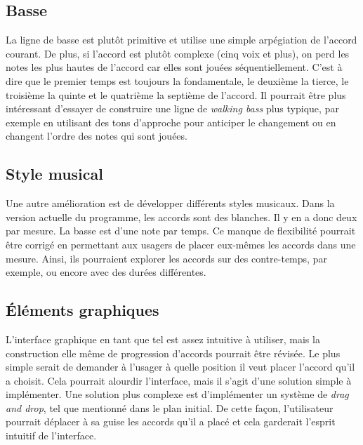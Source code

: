 \documentclass[letterpaper,12pt]{scrartcl}
\begin{document}
		\subsection{Basse}
		La ligne de basse est plutôt primitive et utilise une simple arpégiation de l'accord courant. De plus, si l'accord est plutôt complexe (cinq voix et plus), on perd les notes les plus hautes de l'accord car elles sont jouées séquentiellement. C'est à dire que le premier temps est toujours la fondamentale, le deuxième la tierce, le troisième la quinte et le quatrième la septième de l'accord. Il pourrait être plus intéressant d'essayer de construire une ligne de \textit{walking bass} plus typique, par exemple en utilisant des tons d'approche pour anticiper le changement ou en changent l'ordre des notes qui sont jouées.
		
		\subsection{Style musical}
		Une autre amélioration est de développer différents styles musicaux. Dans la version actuelle du programme, les accords sont des blanches. Il y en a donc deux par mesure. La basse est d'une note par temps. Ce manque de flexibilité pourrait être corrigé en permettant aux usagers de placer eux-mêmes les accords dans une mesure. Ainsi, ils pourraient explorer les accords sur des contre-temps, par exemple, ou encore avec des durées différentes.
		\subsection{Éléments graphiques}
		L'interface graphique en tant que tel est assez intuitive à utiliser, mais la construction elle même de progression d'accords pourrait être révisée. Le plus simple serait de demander à l'usager à quelle position il veut placer l'accord qu'il a choisit. Cela pourrait alourdir l'interface, mais il s'agit d'une solution simple à implémenter. Une solution plus complexe est d'implémenter un système de \textit{drag and drop}, tel que mentionné dans le plan initial. De cette façon, l'utilisateur pourrait déplacer à sa guise les accords qu'il a placé et cela garderait l'esprit intuitif de l'interface.
\end{document}
